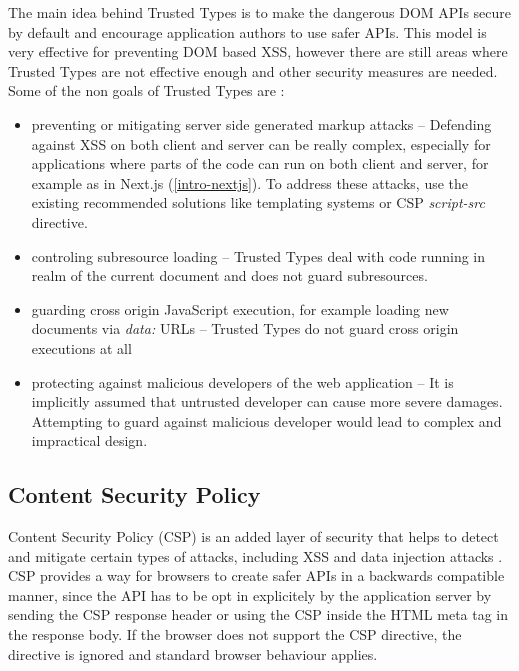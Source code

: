The main idea behind Trusted Types is to make the dangerous DOM APIs secure by default and encourage
application authors to use safer APIs. This model is very effective for preventing DOM based XSS,
however there are still areas where Trusted Types are not effective enough and other security
measures are needed. Some of the non goals of Trusted Types are \cite{tt_spec:non_goals}:

\begin{itemize}
  \item preventing or mitigating server side generated markup attacks -- Defending against XSS on
        both client and server can be really complex, especially for applications where parts of the
        code can run on both client and server, for example as in Next.js (\ref{intro-nextjs}). To
        address these attacks, use the existing recommended solutions like templating systems or CSP
        \emph{script-src} directive.
  \item controling subresource loading -- Trusted Types deal with code running in realm of the
        current document and does not guard subresources.
  \item guarding cross origin JavaScript execution, for example loading new documents via
        \emph{data:} URLs -- Trusted Types do not guard cross origin executions at all
  \item protecting against malicious developers of the web application -- It is implicitly assumed
        that untrusted developer can cause more severe damages. Attempting to guard against
        malicious developer would lead to complex and impractical design.
\end{itemize}

\subsection{Content Security Policy}
\label{csp}

Content Security Policy (CSP) is an added layer of security that helps to detect and mitigate
certain types of attacks, including XSS and data injection attacks \cite{mdn_csp_def}. CSP provides
a way for browsers to create safer APIs in a backwards compatible manner, since the API has to be
opt in explicitely by the application server by sending the CSP response header or using the CSP
inside the HTML meta tag in the response body. If the browser does not support the CSP directive,
the directive is ignored and standard browser behaviour applies.


